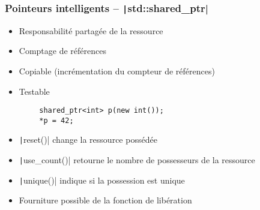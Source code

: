 \documentclass[C++.tex]{subfiles}
\begin{document}
\begin{frame}[fragile]
	\frametitle{Pointeurs intelligents -- \texttt|std::shared_ptr|}
	\begin{itemize}
		\item Responsabilité partagée de la ressource
		\item Comptage de références
		\item Copiable (incrémentation du compteur de références)
		\item Testable
	\end{itemize}

	\begin{verbatim}
		shared_ptr<int> p(new int());
		*p = 42;
	\end{verbatim}

	\begin{itemize}
		\item \texttt|reset()| change la ressource possédée


		\item \texttt|use_count()| retourne le nombre de possesseurs de la ressource
		\item \texttt|unique()| indique si la possession est unique
		\item Fourniture possible de la fonction de libération
	\end{itemize}
\end{frame}
\end{document}
